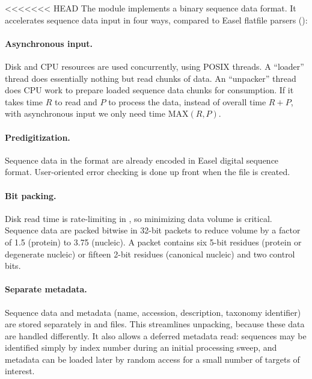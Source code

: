<<<<<<< HEAD
The  module implements a binary sequence data
format. It accelerates sequence data input in four ways, compared to
Easel flatfile parsers ():

\paragraph{Asynchronous input.}
   Disk and CPU resources are used concurrently, using POSIX threads.
   A ``loader'' thread does essentially nothing but read chunks of
   data.  An ``unpacker'' thread does CPU work to prepare loaded
   sequence data chunks for consumption. If it takes time $R$ to read
   and $P$ to process the data, instead of overall time $R+P$, with
   asynchronous input we only need time $\mathrm{MAX}(R,P)$.

\paragraph{Predigitization.} 
  Sequence data in the  format are already encoded in
  Easel digital sequence format.  User-oriented error checking is done
  up front when the  file is created.
                                                                     
\paragraph{Bit packing.} 
  Disk read time is rate-limiting in , so minimizing
  data volume is critical.  Sequence data are packed bitwise
  in 32-bit packets to reduce volume by a factor of 1.5 (protein) to
  3.75 (nucleic). A packet contains six 5-bit residues (protein or
  degenerate nucleic) or fifteen 2-bit residues (canonical nucleic) and two
  control bits.
                                                                     
\paragraph{Separate metadata.} 
  Sequence data and metadata (name, accession, description, taxonomy
  identifier) are stored separately in  and 
  files. This streamlines unpacking, because these data are handled
  differently.  It also allows a deferred metadata read: sequences may
  be identified simply by index number during an initial processing
  sweep, and metadata can be loaded later by random access for a small
  number of targets of interest.

